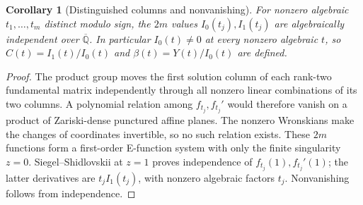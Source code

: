 \documentclass[11pt]{article}
\newtheorem{corollary}[theorem]{Corollary}
\theoremstyle{definition}
\theoremstyle{remark}
\begin{document}
\begin{corollary}[Distinguished columns and nonvanishing]\label{cf:nonzero}
For nonzero algebraic $t_1,\ldots,t_m$ distinct modulo sign, the $2m$ values
$I_0(t_j),I_1(t_j)$ are algebraically independent over
$\overline{\mathbb Q}$. In particular $I_0(t)\ne0$ at every nonzero
algebraic $t$, so $C(t)=I_1(t)/I_0(t)$ and $\beta(t)=Y(t)/I_0(t)$ are defined.
\end{corollary}
\begin{proof}
The product group moves the first solution column of each rank-two
fundamental matrix independently through all nonzero linear combinations
of its two columns. A polynomial relation among $f_{t_j},f_{t_j}'$
would therefore vanish on a product of Zariski-dense punctured affine
planes. The nonzero Wronskians make the changes of coordinates invertible,
so no such relation exists. These $2m$ functions form a first-order
E-function system with only the finite singularity $z=0$.
Siegel--Shidlovskii at $z=1$ proves independence of
$f_{t_j}(1),f_{t_j}'(1)$; the latter derivatives are
$t_jI_1(t_j)$, with nonzero algebraic factors $t_j$.
Nonvanishing follows from independence.
\end{proof}
\end{document}
